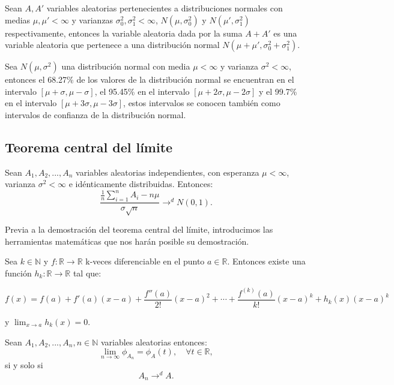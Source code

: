 \documentclass[../proyecto.tex]{memoir}
\begin{document}
\begin{prop} 
Sean $A, A'$ variables aleatorias pertenecientes a distribuciones normales con medias $\mu,\mu' < \infty$ y varianzas $\sigma_{0}^2,\sigma_{1}^{2} < \infty$, $N(\mu,\sigma_{0}^{2})$ y $N(\mu',\sigma_{1}^{2})$ respectivamente, entonces la variable aleatoria dada por la suma $A+A'$ es una variable aleatoria que pertenece a una distribución normal $N(\mu + \mu', \sigma_{0}^{2}+\sigma_{1}^{2} )$.
\end{prop}

\begin{prop} \label{prop_normal}
Sea $N(\mu,\sigma^2)$ una distribución normal con media $\mu<\infty$ y varianza $\sigma^2<\infty$, entonces el 68.27\% de los valores de la distribución normal se encuentran en el intervalo $[\mu+\sigma, \mu-\sigma]$, el 95.45\% en el intervalo $[\mu+2\sigma, \mu-2\sigma]$ y el 99.7\% en el intervalo $[\mu+3\sigma, \mu-3\sigma]$, estos intervalos se conocen también como intervalos de confianza de la distribución normal.
\end{prop}

\subsection{Teorema central del límite}

\begin{teorema} \label{central}
Sean $A_{1},A_{2},...,A_{n}$ variables aleatorias independientes, con esperanza $\mu < \infty$, varianza $\sigma^2 < \infty$ e idénticamente distribuidas. Entonces: $$
\frac{ \frac{1}{n}\sum_{i=1}^nA_i - n\mu}{ \sigma \sqrt{n}} \to^d N(0,1).
$$
\end{teorema}

Previa a la demostración del teorema central del límite, introducimos las herramientas matemáticas que nos harán posible su demostración.

\begin{teorema}

Sea $k \in \mathds{N}$ y $f: \mathds{R} \to \mathds{R}$ k-veces diferenciable en el punto $a \in \mathds{R}$. Entonces existe una función $h_k: \mathds{R} \to \mathds{R}$ tal que:

$$
f(x)=f(a)+f'(a)(x-a)+\frac{f''(a)}{2!}(x-a)^2+\dotsb+\frac{f^{(k)}(a)}{k!}(x-a)^k + h_k(x)(x-a)^k
$$

y $\lim_{x\to a} h_k(x) = 0$.
\end{teorema}

\begin{teorema} \label{cont}
Sean $A_1, A_2,...,A_n, n\in\mathds{N}$ variables aleatorias entonces: $$
\lim_{n \to \infty }{\phi_{A_n}} = \phi_{A}(t), \quad \forall t\in \mathds{R},
$$
si y solo si $$
A_n \to^d A.
$$

\end{teorema}
\end{document}
